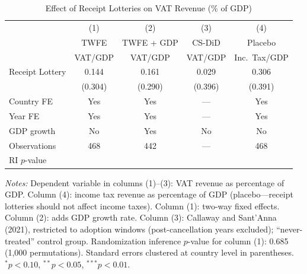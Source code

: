 \begin{table}[t]
\centering
\caption{Effect of Receipt Lotteries on VAT Revenue (\% of GDP)}
\label{tab:main}
\begin{tabular}{lcccc}
\toprule
 & (1) & (2) & (3) & (4) \\
 & TWFE & TWFE + GDP & CS-DiD & Placebo \\
 & VAT/GDP & VAT/GDP & VAT/GDP & Inc.\ Tax/GDP \\
\midrule
Receipt Lottery & 0.144 & 0.161 & 0.029 & 0.306 \\
 & (0.304) & (0.290) & (0.396) & (0.391) \\
\midrule
Country FE & Yes & Yes & --- & Yes \\
Year FE & Yes & Yes & --- & Yes \\
GDP growth & No & Yes & No & No \\
Observations & 468 & 442 & --- & 468 \\
RI $p$-value & & & & \\
\bottomrule
\end{tabular}
\begin{tablenotes}
\small
\item \textit{Notes:} Dependent variable in columns (1)--(3): VAT revenue as percentage of GDP. Column (4): income tax revenue as percentage of GDP (placebo---receipt lotteries should not affect income taxes). Column (1): two-way fixed effects. Column (2): adds GDP growth rate. Column (3): Callaway and Sant'Anna (2021), restricted to adoption windows (post-cancellation years excluded); ``never-treated'' control group. Randomization inference $p$-value for column (1): 0.685 (1,000 permutations). Standard errors clustered at country level in parentheses. $^{*}p<0.10$, $^{**}p<0.05$, $^{***}p<0.01$.
\end{tablenotes}
\end{table}
